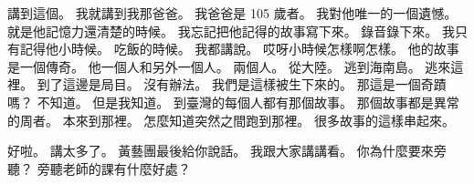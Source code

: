 \hypertarget{w01:cue:3879}{}講到這個。
\hypertarget{w01:cue:3880}{}我就講到我那爸爸。
\hypertarget{w01:cue:3881}{}我爸爸是 105 歲者。
\hypertarget{w01:cue:3882}{}我對他唯一的一個遺憾。
\hypertarget{w01:cue:3883}{}就是他記憶力還清楚的時候。
\hypertarget{w01:cue:3884}{}我忘記把他記得的故事寫下來。
\hypertarget{w01:cue:3885}{}錄音錄下來。
\hypertarget{w01:cue:3886}{}我只有記得他小時候。
\hypertarget{w01:cue:3887}{}吃飯的時候。
\hypertarget{w01:cue:3888}{}我都講說。
\hypertarget{w01:cue:3889}{}哎呀小時候怎樣啊怎樣。
\hypertarget{w01:cue:3890}{}他的故事是一個傳奇。
\hypertarget{w01:cue:3891}{}他一個人和另外一個人。
\hypertarget{w01:cue:3892}{}兩個人。
\hypertarget{w01:cue:3893}{}從大陸。
\hypertarget{w01:cue:3894}{}逃到海南島。
\hypertarget{w01:cue:3895}{}逃來這裡。
\hypertarget{w01:cue:3896}{}到了這邊是局目。
\hypertarget{w01:cue:3897}{}沒有辦法。
\hypertarget{w01:cue:3898}{}我們是這樣被生下來的。
\hypertarget{w01:cue:3899}{}那這是一個奇蹟嗎？
\hypertarget{w01:cue:3900}{}不知道。
\hypertarget{w01:cue:3901}{}但是我知道。
\hypertarget{w01:cue:3902}{}到臺灣的每個人都有那個故事。
\hypertarget{w01:cue:3903}{}那個故事都是異常的周者。
\hypertarget{w01:cue:3904}{}本來到那裡。
\hypertarget{w01:cue:3905}{}怎麼知道突然之間跑到那裡。
\hypertarget{w01:cue:3906}{}很多故事的這樣串起來。

\hypertarget{w01:cue:3907}{}好啦。
\hypertarget{w01:cue:3908}{}講太多了。
\hypertarget{w01:cue:3909}{}黃藝團最後給你說話。
\hypertarget{w01:cue:3910}{}我跟大家講講看。
\hypertarget{w01:cue:3911}{}你為什麼要來旁聽？
\hypertarget{w01:cue:3912}{}旁聽老師的課有什麼好處？

